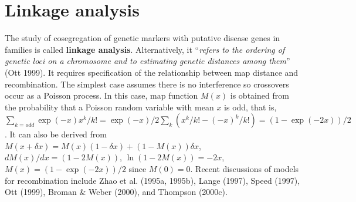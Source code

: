 \section{Linkage analysis}

The study of cosegregation of genetic markers with putative disease genes in
families is called {\bf linkage analysis}.  Alternatively, it ``{\em refers to
the ordering of genetic loci on a chromosome and to estimating genetic
distances among them}'' (Ott 1999).  It requires specification of the
relationship between map distance and recombination.  The simplest case assumes
there is no interference so crossovers occur as a Poisson process.  In this
case, map function $M(x)$ is obtained from the probability that a Poisson
random variable with mean $x$ is odd, that is, $\sum_{k=odd}\exp(-x){x^k}/{k!}
= \exp(-x)/2 \sum_{k}\left({x^k}/{k!}-{(-x)^k}/{k!}\right) = (1-\exp(-2x))/2$.
It can also be derived from $M(x+\delta x)=M(x)(1-\delta x)+(1-M(x))\delta x$,
${dM(x)}/{dx}=(1-2M(x))$, $\ln(1-2M(x))=-2x$, $M(x)=(1-\exp(-2x))/2$ since
$M(0)=0$.  Recent discussions of models for recombination include Zhao et al.
(1995a, 1995b), Lange (1997), Speed (1997), Ott (1999), Broman \& Weber (2000),
and Thompson (2000c).

